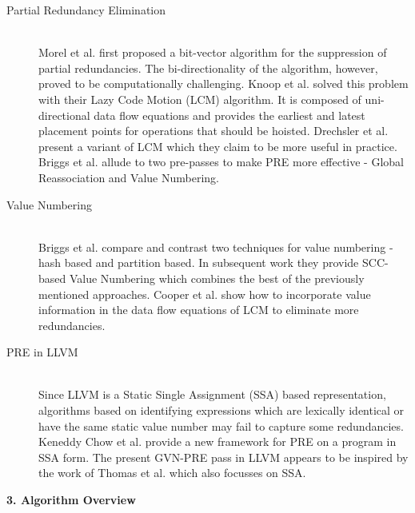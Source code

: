 \documentclass[10pt,twoside]{report}
\begin{document}
\begin{description}
\item [Partial Redundancy Elimination]    \hfill \\
Morel et al. \cite{Morel} first proposed a bit-vector algorithm for the
suppression of partial redundancies. The bi-directionality of the algorithm,
            however, proved to be computationally challenging. Knoop et al.
            \cite{Knoop} solved this problem with their Lazy Code Motion (LCM)
  algorithm. It is composed of uni-directional data flow equations and provides
  the earliest and latest placement points for operations that should be
  hoisted. Drechsler et al. \cite{Drechsler} present a variant of LCM which they claim to
  be more useful in practice. Briggs et al. \cite{Briggs2} allude to two
  pre-passes to make PRE more effective - Global Reassociation and Value
  Numbering.

\item [Value Numbering] \hfill \\
Briggs et al. \cite{Briggs} compare and contrast two techniques for
value numbering - hash based\cite{CS} and partition based\cite{AWZ}. In subsequent work they
provide SCC-based Value Numbering \cite{Cooper95scc-basedvalue}  which combines
the best of the previously mentioned approaches. Cooper et al.
\cite{CVDC} show how to incorporate value
information in the data flow equations of LCM to eliminate more redundancies.

\item [PRE in LLVM] \hfill \\
Since LLVM is a Static Single Assignment (SSA) based representation, algorithms
based on identifying expressions which are lexically identical or have the same
static value number may fail to capture some redundancies.
Keneddy Chow et al.
\cite{Kennedy99partialredundancy} provide a new framework for PRE on a program
in SSA form. The present GVN-PRE pass in LLVM appears to be inspired by the
work of Thomas et al. \cite{Vandrunen04value-basedpartial} which also focusses
on SSA.
\end{description}

\begin{flushleft}
\textbf{\Large{3. Algorithm Overview}}
\end{flushleft}
\end{document}

